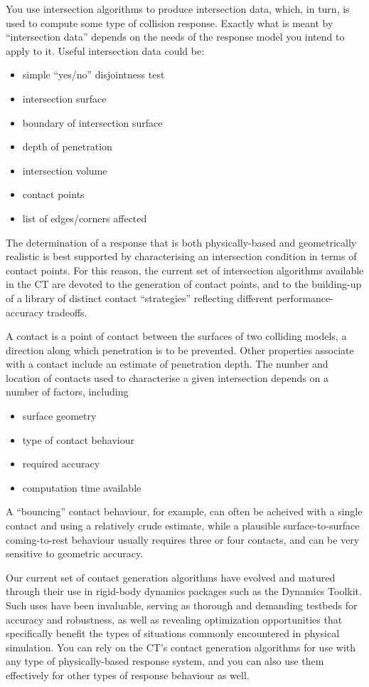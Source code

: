 \documentclass[11pt]{article}
\begin{document}
You use 
intersection algorithms to produce intersection data, which, in turn, is
used to compute some type of collision response. 
Exactly what is meant by ``intersection data'' 
depends on the needs of the response model you intend to apply to it.
Useful intersection data could be:

\begin{itemize}
\item simple ``yes/no'' disjointness test
\item intersection surface
\item boundary of intersection surface
\item depth of penetration
\item intersection volume
\item contact points
\item list of edges/corners affected
\end{itemize}

The determination of a response that is both physically-based and geometrically realistic is best supported by characterising an intersection condition in terms of contact points.
For this reason,
the current set of intersection algorithms available in the CT are devoted
to the generation of contact points, and to the building-up of a library of
distinct contact ``strategies'' reflecting different performance-accuracy
tradeoffs.  

A contact is a point of contact between the surfaces of two colliding
models, a direction along which penetration is to be prevented. Other
properties associate with a contact include an estimate of penetration depth.
The number and location of contacts used to characterise a given intersection depends on a number of factors, including

\begin{itemize}
\item surface geometry
\item type of contact behaviour 
\item required accuracy 
\item computation time available
\end{itemize}

A ``bouncing'' contact behaviour, for example, can often be acheived with
a single contact and using a relatively crude estimate, while a 
plausible surface-to-surface coming-to-rest behaviour usually requires three or four contacts, and can be very sensitive to geometric accuracy.


Our current set of contact generation algorithms have
evolved and matured through their use in rigid-body dynamics packages such
as the Dynamics Toolkit. 
Such uses have been invaluable, serving as thorough and demanding testbeds
for accuracy and robustness, as well as revealing
optimization opportunities that specifically benefit the
types of situations commonly encountered in physical simulation.
You can rely on the CT's contact generation algorithms for use with any type of physically-based
response system, and you can also use them effectively for other types of
response behaviour as well.
\end{document}
